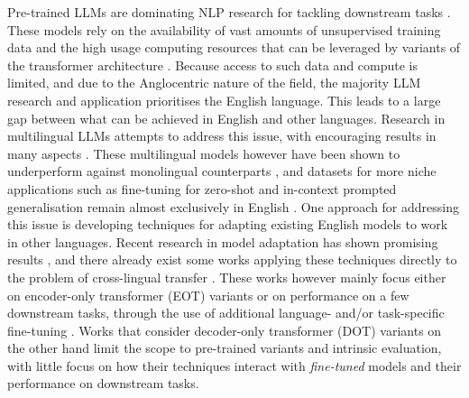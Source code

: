 \documentclass[11pt]{article}
\begin{document}
Pre-trained LLMs are dominating NLP research for tackling downstream tasks
\citep{devlin_bert_2019,raffel_exploring_2020,brown_language_2020}. These models rely on the
availability of vast amounts of unsupervised training data and the high usage computing resources
that can be leveraged by variants of the transformer architecture \citep{vaswani_attention_2017}.
Because access to such data and compute is limited, and due to the Anglocentric nature of the field,
the majority LLM research and application prioritises the English language. This leads to a large
gap between what can be achieved in English and other languages. Research in multilingual LLMs
attempts to address this issue, with encouraging results in many aspects
\citep{conneau_unsupervised_2020,bigscience_workshop_bloom_2022}. These multilingual models however
have been shown to underperform against monolingual counterparts \citep{wu_are_2020}, and datasets
for more niche applications such as fine-tuning for zero-shot and in-context prompted generalisation
remain almost exclusively in English \citep{bach_promptsource_2022,mishra_cross-task_2022}. One
approach for addressing this issue is developing techniques for adapting existing English models to
work in other languages. Recent research in model adaptation has shown promising results
\citep{houlsby_parameter-efficient_2019,ainsworth_git_2022}, and there already exist some works
applying these techniques directly to the problem of cross-lingual transfer
\citep{artetxe_cross-lingual_2020}. These works however mainly focus either on encoder-only
transformer (EOT) variants or on performance on a few downstream tasks, through the use of
additional language- and/or task-specific fine-tuning
\citep{de_vries_adapting_2021,gogoulou_cross-lingual_2022}. Works that consider decoder-only
transformer (DOT) variants on the other hand \citep{de_vries_as_2021, minixhofer_wechsel_2022} limit
the scope to pre-trained variants and intrinsic evaluation, with little focus on how their
techniques interact with \textit{fine-tuned} models and their performance on downstream tasks.
\end{document}
